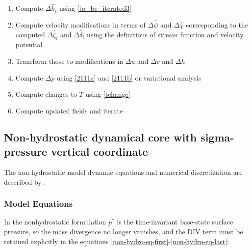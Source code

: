 \begin{enumerate}
  \item Compute $\Delta \hat{h}_i$ using \ref{to_be_iterated3}
  \item Compute velocity modifications in terms of $\Delta \hat{\psi}$
    and $\Delta \hat{\chi}$ corresponding to the computed
    $\Delta \hat{\zeta}_i$ and $\Delta \hat{\delta}_i$ using the
    definitions of stream function and velocity potential
  \item Transform those to modifications in $\Delta u$ and $\Delta v$
    and $\Delta h$
  \item Compute $\Delta p$ using \ref{2111a} and \ref{2111b} or
    \cite{Daley} variational analysis
  \item Compute changes to $T$ using \ref{tchange}
  \item Compute updated fields and iterate
\end{enumerate}

\newpage

\subsection{Non-hydrostatic dynamical core with sigma-pressure vertical
coordinate}
The non-hydrostatic model dynamic equations and numerical discretization are
described by \cite{Klemp_1978,Dudhia_93,Grell_94}.

\subsubsection{Model Equations}

In the nonhydrostatic formulation $p^{\ast}$ is the time-invariant base-state
surface pressure, so the mass divergence no longer vanishes, and the DIV term
must be retained explicitly in the equations
\ref{non-hydro-eq-first}-\ref{non-hydro-eq-last}:

